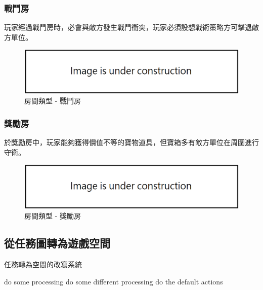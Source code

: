 \subsubsection{戰鬥房}
\label{sssec:method-spacepieces-types-battle}

玩家經過戰鬥房時，必會與敵方發生戰鬥衝突，玩家必須設想戰術策略方可擊退敵方單位。

\begin{figure}[ht]
  \begin{center}
    \includegraphics[width=1.0\textwidth]{figures/under_construction.png}
    \caption{房間類型 - 戰鬥房}
    \label{fig:roomtype-battle}
  \end{center}
\end{figure}

\subsubsection{獎勵房}
\label{sssec:method-spacepieces-types-reward}

於獎勵房中，玩家能夠獲得價值不等的寶物道具，但寶箱多有敵方單位在周圍進行守衛。

\begin{figure}[ht]
  \begin{center}
    \includegraphics[width=1.0\textwidth]{figures/under_construction.png}
    \caption{房間類型 - 獎勵房}
    \label{fig:roomtype-reward}
  \end{center}
\end{figure}

\subsection{從任務圖轉為遊戲空間}
\label{ssec:method-spacepieces-frommissiontospace}

\begin{algorithm}
    \caption{任務轉為空間的改寫系統}
    \label{alg:algorithm-mission-to-space-rewritesystem}
    \begin{algorithmic}
            \STATE do some processing
            \STATE do some different processing
        \ELSE
            \STATE do the default actions
        \ENDIF
    \end{algorithmic}
\end{algorithm}

